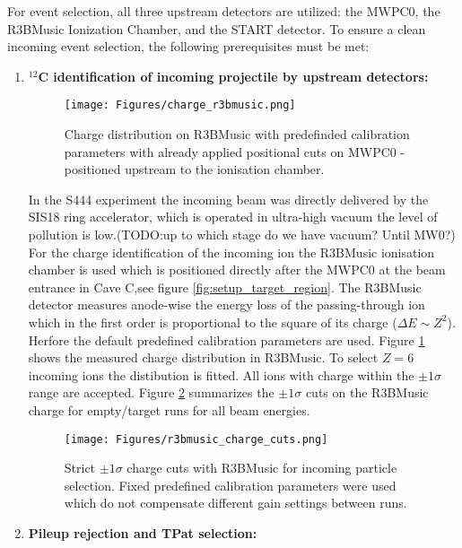 For event selection, all three upstream detectors are utilized: the MWPC0, the R3BMusic Ionization Chamber, and the START detector. To ensure a clean incoming event selection, the following prerequisites must be met:
\begin{enumerate}
\item \textbf{$^{12}$C identification of incoming projectile by upstream detectors:}\newline
\begin{figure}[htpb]
    \centering
    \texttt{[image: Figures/charge\_r3bmusic.png]}
    \caption{
    Charge distribution on R3BMusic with predefinded calibration parameters with already applied positional cuts on MWPC0 - positioned upstream to the ionisation chamber. 
    }
    \label{fig:r3bmusic_charge}
\end{figure}
In the S444 experiment the incoming beam was directly delivered by the SIS18 ring accelerator, which is operated in ultra-high vacuum the level of pollution is low.(TODO:up to which stage do we have vacuum? Until MW0?)\newline %
For the charge identification of the incoming ion the R3BMusic ionisation chamber is used which is positioned directly after the MWPC0 at the beam entrance in Cave C,see figure \ref{fig:setup_target_region}. The R3BMusic detector measures anode-wise the energy loss of the passing-through ion which in the first order is proportional to the square of its charge ($\Delta E \sim Z^{2}$). Herfore the default predefined calibration parameters are used. Figure \ref{fig:r3bmusic_charge} shows the measured charge distribution in R3BMusic. To select $Z = 6$ incoming ions the distibution is fitted. All ions with charge within the $\pm 1 \sigma$ range are accepted. Figure \ref{fig:r3bmusic_cuts} summarizes the $\pm 1 \sigma$ cuts on the R3BMusic charge for empty/target runs for all beam energies.   
\begin{figure}
\centering
\texttt{[image: Figures/r3bmusic\_charge\_cuts.png]}
\caption{Strict $\pm 1 \sigma$ charge cuts with R3BMusic for incoming particle selection. Fixed predefined calibration parameters were used which do not compensate different gain settings between runs. }
\label{fig:r3bmusic_cuts}
\end{figure}
\item \textbf{Pileup rejection and TPat selection:}\newline

\end{enumerate}
